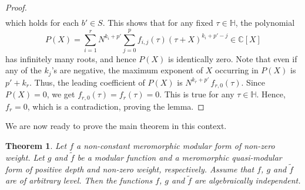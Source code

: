 \documentclass[11pt, reqno]{amsart}
\newtheorem{theorem}{Theorem}[section]
\begin{document}
\begin{proof}
$$\begin{aligned}
\end{aligned}
$$
which holds for each $b'\in S$. This shows that for any fixed $\tau\in \mathbb{H}$, the polynomial 
$$
P(X)=\sum_{i=1}^r N^{k_i+p'}\sum_{j=0}^pf_{i,j}(\tau)\left(\tau+X\right)^{k_i+p'-j}\in \mathbb{C}[X]
$$
has infinitely many roots, and hence $P(X)$ is identically zero. Note that even if any of the $k_j$'s are negative, the maximum exponent of $X$ occurring in $P(X)$ is $p'+ k_r$. Thus, the leading coefficient of $P(X)$ is $N^{k_r+p'}\, f_{r,0}(\tau)$. Since $P(X)=0$, we get $f_{r,0}(\tau)=f_r(\tau)=0$. This is true for any $\tau\in\mathbb{H}$. Hence, $f_r=0$, which is a contradiction, proving the lemma.  
\end{proof}

We are now ready to prove the main theorem in this context.
\begin{theorem}\label{algebraic-indep-fn-thm}
Let $f$ a non-constant meromorphic modular form of non-zero weight. Let $g$ and $\widetilde{f}$ be a modular function and a meromorphic quasi-modular form of positive depth and non-zero weight, respectively. Assume that $f$, $g$ and $\widetilde{f}$ are of arbitrary level. Then the functions $f$, $g$ and $\widetilde{f}$ are algebraically independent. 
\end{theorem}
\end{document}
